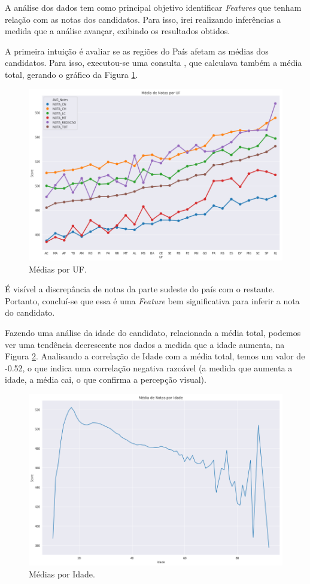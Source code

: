 \documentclass{article}
\begin{document}
A análise dos dados tem como principal objetivo identificar \emph{Features} que tenham relação com as notas dos candidatos. Para isso, irei realizando inferências a medida que a análise avançar, exibindo os resultados obtidos.

A primeira intuição é avaliar se as regiões do País afetam as médias dos candidatos. Para isso, executou-se uma consulta , que calculava também a média total, gerando o gráfico da Figura \ref{fig:avg_uf}.

\begin{figure}[H]
\centering
  \includegraphics[width= 0.8 \linewidth]{img/mean_by_uf.png}
  \caption{Médias por UF.}
  \label{fig:avg_uf}
\end{figure}

É visível a discrepância de notas da parte sudeste do país com o restante. Portanto, concluí-se que essa é uma \emph{Feature} bem significativa para inferir a nota do candidato.

Fazendo uma análise da idade do candidato, relacionada a média total, podemos ver uma tendência decrescente nos dados a medida que a idade aumenta, na Figura \ref{fig:mean_by_age}. Analisando a correlação de Idade com a média total, temos um valor de -0.52, o que indica uma correlação negativa razoável (a medida que aumenta a idade, a média cai, o que confirma a percepção visual).

\begin{figure}[H]
\centering
  \includegraphics[width=0.8 \linewidth]{img/mean_by_age.png}
  \caption{Médias por Idade.}
  \label{fig:mean_by_age}
\end{figure}
\end{document}
